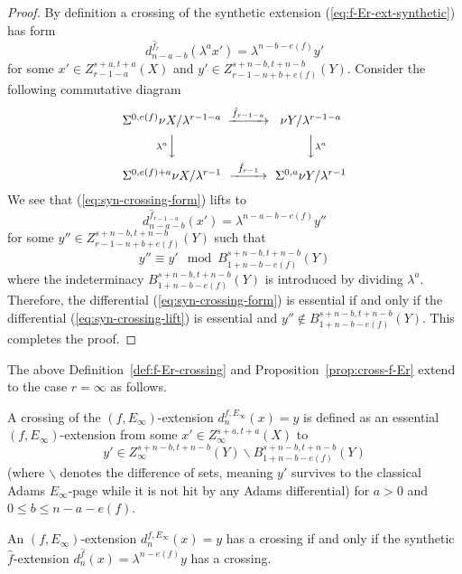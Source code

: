\begin{proof}
    By definition a crossing of the synthetic extension (\ref{eq:f-Er-ext-synthetic}) has form
    \begin{equation}\label{eq:syn-crossing-form}
        d_{n-a-b}^{\hat f_r}(\lambda^ax')=\lambda^{n-b-e(f)}y'
    \end{equation}
    for some $x'\in Z_{r-1-a}^{s+a,t+a}(X)$ and $y'\in Z_{r-1-n+b+e(f)}^{s+n-b,t+n-b}(Y)$. Consider the following commutative diagram
    $$\begin{CD}
        \Sus^{0,e(f)}\nu X/\lambda^{r-1-a} @>{\hat f_{r-1-a}}>> \nu Y/\lambda^{r-1-a} \\
        @V{\lambda^a}VV @VV{\lambda^a}V \\
        \Sus^{0,e(f)+a}\nu X/\lambda^{r-1} @>{\hat f_{r-1}}>> \Sus^{0,a}\nu Y/\lambda^{r-1}
    \end{CD}$$
    We see that (\ref{eq:syn-crossing-form}) lifts to
    \begin{equation}\label{eq:syn-crossing-lift}
        d_{n-a-b}^{\hat f_{r-1-a}}(x')= \lambda^{n-a-b-e(f)}y''
    \end{equation}
    for some $y''\in Z_{r-1-n+b+e(f)}^{s+n-b,t+n-b}(Y)$ such that
    $$y''\equiv y'\mod B_{1+n-b-e(f)}^{s+n-b,t+n-b}(Y)$$
    where the indeterminacy $B_{1+n-b-e(f)}^{s+n-b,t+n-b}(Y)$ is introduced by dividing $\lambda^a$.
    Therefore, the differential (\ref{eq:syn-crossing-form}) is essential if and only if the differential (\ref{eq:syn-crossing-lift}) is essential and $y''\notin B_{1+n-b-e(f)}^{s+n-b,t+n-b}(Y)$. This completes the proof.
\end{proof}

The above Definition~\ref{def:f-Er-crossing} and Proposition~\ref{prop:cross-f-Er} extend to the case $r=\infty$ as follows.

\begin{definition}\label{def:f-Einfty-crossing}
    A crossing of the $(f,E_\infty)$-extension $d_{n}^{f,E_\infty}(x)=y$ is defined as an essential $(f, E_\infty)$-extension from some $x'\in Z_{\infty}^{s+a,t+a}(X)$ to
    $$y'\in Z_{\infty}^{s+n-b,t+n-b}(Y)\backslash B_{1+n-b-e(f)}^{s+n-b,t+n-b}(Y)$$
    (where $\backslash$ denotes the difference of sets, meaning $y'$ survives to the classical Adams $E_{\infty}$-page while it is not hit by any Adams differential) for $a>0$ and $0\le b\le n-a-e(f)$.
\end{definition}

\begin{proposition}\label{prop:cross-f-Einfty}
    An $(f,E_\infty)$-extension $d_{n}^{f,E_\infty}(x)=y$ has a crossing if and only if the synthetic $\hat f$-extension $d_{n}^{\hat f}(x)=\lambda^{n-e(f)} y$ has a crossing.
\end{proposition}

